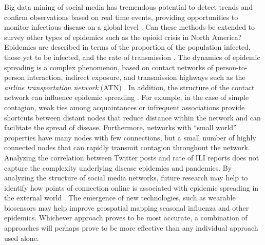 \documentclass[sigconf]{acmart}
\begin{document}
Big data mining of social media has tremendous potential to detect trends and confirm 
observations based on real time events, providing opportunities to monitor infectious 
disease on a global level \cite{hay13}. Can these methods be extended to survey other 
types of epidemics such as the opioid crisis in North America?\cite{smith16} Epidemics are 
described in terms of the proportion of the population infected, those yet to be infected, 
and the rate of transmission \cite{hethcote00}. The dynamics of epidemic spreading is a 
complex phenomenon, based on contact networks of person-to-person interaction, indirect 
exposure, and transmission highways such as the {\it airline transportation network} (ATN) 
\cite{Colizza06}. In addition, the structure of the contact network can influence epidemic 
spreading \cite{pastor01}. For example, in the case of simple contagion, weak ties among 
acquaintances or infrequent associations provide shortcuts between distant nodes that reduce 
distance within the network \cite{granovetter73} and can facilitate the spread of disease. 
Furthermore, networks with ``small world'' properties have many nodes with few connections, 
but a small number of highly connected nodes that can rapidly transmit contagion throughout 
the network. Analyzing the correlation between Twitter posts and rate of ILI reports does 
not capture the complexity underlying disease epidemics and pandemics. By analyzing the 
structure of social media networks, future research may help to identify how points of 
connection online is associated with epidemic spreading in the external world \cite{zhu17}.
The emergence of new technologies, such as wearable biosensors \cite{carreiro15} may help 
improve geospatial mapping seasonal influenza and other epidemics. Whichever approach proves 
to be most accurate, a combination of approaches will perhaps prove to be more effective than
any individual approach used alone. 


 
\end{document}
